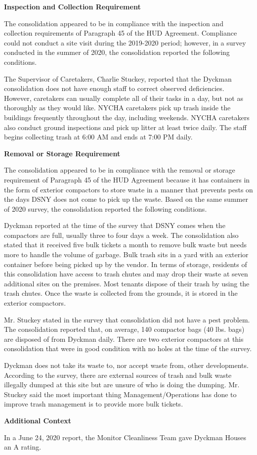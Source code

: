  

\textbf{Inspection and Collection Requirement} 

 

The consolidation appeared to be in compliance with the inspection and collection requirements of Paragraph 45 of the HUD Agreement. Compliance could not conduct a site visit during the 2019-2020 period; however, in a survey conducted in the summer of 2020, the consolidation reported the following conditions.

The Supervisor of Caretakers, Charlie Stuckey, reported that the Dyckman consolidation does not have enough staff to correct observed deficiencies. However, caretakers can usually complete all of their tasks in a day, but not as thoroughly as they would like. NYCHA caretakers pick up trash inside the buildings frequently throughout the day, including weekends. NYCHA caretakers also conduct ground inspections and pick up litter at least twice daily. The staff begins collecting trash at 6:00 AM and ends at 7:00 PM daily.

\textbf{Removal or Storage Requirement} 

The consolidation appeared to be in compliance with the removal or storage requirement of Paragraph  45 of the HUD Agreement because it has containers in the form of exterior compactors to store waste in a manner that prevents pests on the days DSNY does not come to pick up the waste. Based on the same summer of  2020  survey, the consolidation reported the following conditions.

  

Dyckman reported at the time of the survey that DSNY comes when the compactors are full, usually three to four days a week. The consolidation also stated that it received five bulk tickets a month to remove bulk waste but needs more to handle the volume of garbage. Bulk trash sits in a yard with an exterior container before being picked up by the vendor. In terms of storage, residents of this consolidation have access to trash chutes and may drop their waste at seven additional sites on the premises.  Most tenants dispose of their trash by using the trash chutes. Once the waste is collected from the grounds, it is stored in the exterior compactors.  

 

Mr. Stuckey stated in the survey that consolidation did not have a pest problem. The consolidation reported that, on average, 140 compactor bags (40 lbs. bags)  are disposed of from Dyckman daily. There are two exterior compactors at this consolidation that were in good condition with no holes at the time of the survey. 

Dyckman does not take its waste to, nor accept waste from, other developments. According to the survey, there are external sources of trash and bulk waste illegally dumped at this site but are unsure of who is doing the dumping. Mr. Stuckey said the most important thing Management/Operations has done to improve trash management is to provide more bulk tickets.

\textbf{Additional Context}  

In a June 24, 2020 report, the Monitor Cleanliness Team gave Dyckman Houses an A rating.  

 